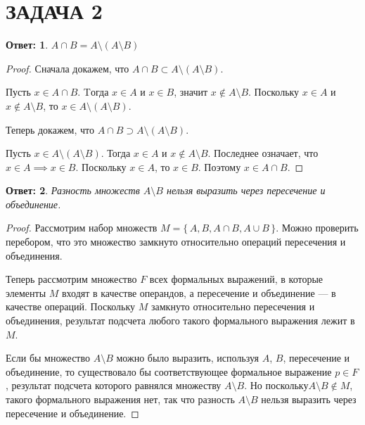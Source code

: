 \documentclass[a4paper]{article}
\theoremstyle{dotless}
\newtheorem*{answer}{Ответ:}
\begin{document}
\section*{ЗАДАЧА 2}

\begin{answer}
$A\cap B = A \setminus (A \setminus B)$
\end{answer}

\begin{proof}
Сначала докажем, что $A\cap B \subset A \setminus (A \setminus B)$. 

Пусть $x\in A\cap B$. Tогда $x \in A$ и $x\in B$, значит $x\not\in A \setminus B$. Поскольку $x \in A$ и $x\not\in A \setminus B$, то $x\in A \setminus (A \setminus B)$.

Теперь докажем, что $A\cap B \supset A \setminus (A \setminus B)$.

Пусть $x\in A \setminus (A \setminus B)$. Тогда $x\in A$ и $x\not\in A \setminus B$. Последнее означает, что $x\in A \implies x\in B$. Поскольку $x\in A$, то $x\in B$. Поэтому $x \in A\cap B$.
\end{proof}

\begin{answer}
Разность множеств $A\setminus B$ нельзя выразить через пересечение и объединение.
\end{answer}

\begin{proof}
Рассмотрим набор множеств $M=\{\,A, B, A\cap B, A\cup B\,\}$. Можно проверить перебором, что это множество замкнуто относительно операций пересечения и объединения.

Теперь рассмотрим множество $F$ всех формальных выражений, в которые элементы $M$ входят в качестве операндов, а пересечение и объединение --- в качестве операций. Поскольку $M$ замкнуто относительно пересечения и объединения, результат подсчета любого такого формального выражения лежит в $M$.

Если бы множество $A\setminus B$ можно было выразить, используя $A$, $B$, пересечение и объединение, то существовало бы соответствующее формальное выражение $p\in F$, результат подсчета которого равнялся множеству $A\setminus B$. Но поскольку$A\setminus B \not\in M$, такого формального выражения нет, так что разность $A\setminus B$ нельзя выразить через пересечение и объединение.
\end{proof}
\end{document}
